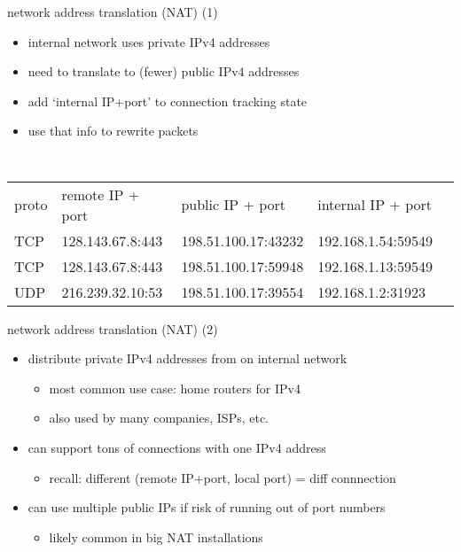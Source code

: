 \begin{frame}{network address translation (NAT) (1)}
    \begin{itemize}
    \item internal network uses private IPv4 addresses
    \item need to translate to (fewer) public IPv4 addresses
    \item add `internal IP+port' to connection tracking state
    \item use that info to rewrite packets
    \end{itemize}
\small\tt
\begin{tabular}{l|l|l|l|l}
proto & remote IP + port & public IP  + port & internal IP + port \\
TCP & 128.143.67.8:443 & 198.51.100.17:43232 & 192.168.1.54:59549 \\ 
TCP & 128.143.67.8:443 & 198.51.100.17:59948 & 192.168.1.13:59549 \\ 
UDP & 216.239.32.10:53 & 198.51.100.17:39554 & 192.168.1.2:31923 \\ 
\end{tabular}
\end{frame}


\begin{frame}{network address translation (NAT) (2)}
    \begin{itemize}
    \item distribute private IPv4 addresses from on internal network
        \begin{itemize}
        \item most common use case: home routers for IPv4
        \item also used by many companies, ISPs, etc.
        \end{itemize}
    \item can support tons of connections with one IPv4 address
        \begin{itemize}
        \item recall: different (remote IP+port, local port) = diff connnection
        \end{itemize}
    \item can use multiple public IPs if risk of running out of port numbers
        \begin{itemize}
        \item likely common in big NAT installations
        \end{itemize}
    \end{itemize}
\end{frame}


